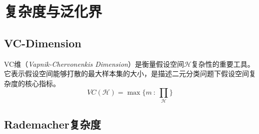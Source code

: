 \chapter{复杂度与泛化界}

\section{VC-Dimension}

VC维（\textsl{Vapnik-Chervonenkis Dimension}）是衡量假设空间$\mathcal{H}$复杂性的重要工具。它表示假设空间能够打散的最大样本集的大小，是描述二元分类问题下假设空间复杂度的核心指标。
\begin{equation}
    VC(\mathcal{H})=\max\{m\ :\ \prod_{\mathcal{H}}\}
\end{equation}

\section{Rademacher复杂度}